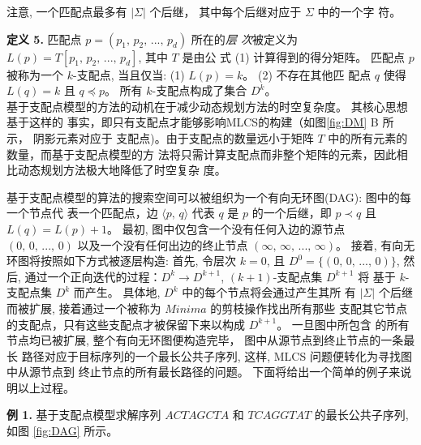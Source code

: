 注意, 一个匹配点最多有 $|\Sigma|$ 个后继， 其中每个后继对应于 $\Sigma$ 中的一个字
符。

\textbf{定义 5.} 匹配点 $p = (p_1,\, p_2,\, ...,\, p_d)$ 所在的\emph{层
  次}被定义为 $L(p) = T[p_1,\, p_2,\, ...,\, p_d]$, 其中 $T$ 是由公
式 (1) 计算得到的得分矩阵。 匹配点 $p$ 被称为一个 $k$-支配点, 当且仅当:
(1) $L(p) = k$。 (2) 不存在其他匹
配点 $q$ 使得 $L(q) = k$ 且 $q \preceq p$。 所有 $k$-支配点构成了集合 $D^k$。\\

基于支配点模型的方法的动机在于减少动态规划方法的时空复杂度。 其核心思想基于这样的
事实，即只有支配点才能够影响MLCS的构建（如图\ref{fig:DM} B 所示， 阴影元素对应于
支配点)。由于支配点的数量远小于矩阵 $T$ 中的所有元素的数量，而基于支配点模型的方
法将只需计算支配点而非整个矩阵的元素，因此相比动态规划方法极大地降低了时空复杂
度。

基于支配点模型的算法的搜索空间可以被组织为一个有向无环图(DAG): 图中的每一个节点代
表一个匹配点，边 $\langle p,\, q \rangle$ 代表 $q$ 是 $p$ 的一个后继，即 $p
\prec q$ 且 $L(q) = L(p) + 1$。 最初, 图中仅包含一个没有任何入边的源节点 $(0,\,
0,\, ...,\, 0)$ 以及一个没有任何出边的终止节点 $(\infty,\, \infty,\, ...,\,
\infty)$。 接着, 有向无环图将按照如下方式被逐层构造: 首先, 令层次 $k =
0$, 且 $D^0 = \{(0,\, 0,\, ...,\, 0)\}$, 然后,
通过一个正向迭代的过程：$D^k \rightarrow D^{k+1}$, $(k+1)$-支配点集 $D^{k+1}$ 将
基于 $k$-支配点集 $D^k$ 而产生。 具体地, $D^k$ 中的每个节点将会通过产生其所
有 $|\Sigma|$ 个后继而被扩展, 接着通过一个被称为 $Minima$ 的剪枝操作找出所有那些
支配其它节点的支配点，只有这些支配点才被保留下来以构成 $D^{k+1}$。 一旦图中所包含
的所有节点均已被扩展, 整个有向无环图便构造完毕， 图中从源节点到终止节点的一条最长
路径对应于目标序列的一个最长公共子序列, 这样, MLCS 问题便转化为寻找图中从源节点到
终止节点的所有最长路径的问题。 下面将给出一个简单的例子来说明以上过程。

\textbf{例 1.} 基于支配点模型求解序列 $ACTAGCTA$ 和 $TCAGGTAT$ 的最长公共子序列,
如图 \ref{fig:DAG} 所示。

